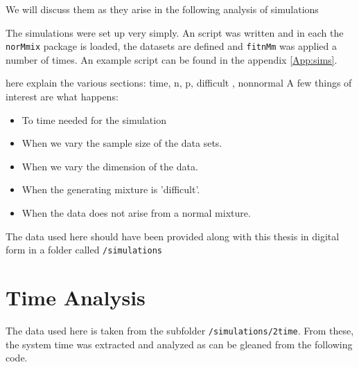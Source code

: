 We will discuss them as they arise in the following analysis of simulations

The simulations were set up very simply. An \Rp script was written and in each
the {\tt norMmix} package is loaded, the datasets are defined and {\tt fitnMm}
was applied a number of times. An example script can be found in the appendix
\ref{App:sims}.

here explain the various sections: time, n, p, difficult , nonnormal 
A few things of interest are what happens:
\begin{itemize}
    \item To time needed for the simulation
    \item When we vary the sample size of the data sets.
    \item When we vary the dimension of the data.
    \item When the generating mixture is 'difficult'.
    \item When the data does not arise from a normal mixture.
\end{itemize}

The data used here should have been provided along with this thesis in digital 
form in a folder called {\tt /simulations}


\section{Time Analysis}


The data used here is taken from the subfolder {\tt /simulations/2time}.
From these, the system time was extracted and analyzed as can be gleaned from
the following code.

